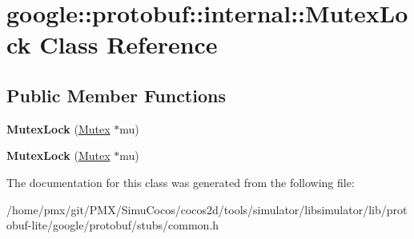 \hypertarget{classgoogle_1_1protobuf_1_1internal_1_1MutexLock}{}\section{google\+:\+:protobuf\+:\+:internal\+:\+:Mutex\+Lock Class Reference}
\label{classgoogle_1_1protobuf_1_1internal_1_1MutexLock}
\subsection*{Public Member Functions}
\begin{DoxyCompactItemize}
\item 
\mbox{\label{classgoogle_1_1protobuf_1_1internal_1_1MutexLock_a484d7e79513d968ad8b90b2513056cdd}} 
{\bfseries Mutex\+Lock} (\hyperlink{classgoogle_1_1protobuf_1_1internal_1_1Mutex}{Mutex} $\ast$mu)
\item 
\mbox{\label{classgoogle_1_1protobuf_1_1internal_1_1MutexLock_a484d7e79513d968ad8b90b2513056cdd}} 
{\bfseries Mutex\+Lock} (\hyperlink{classgoogle_1_1protobuf_1_1internal_1_1Mutex}{Mutex} $\ast$mu)
\end{DoxyCompactItemize}


The documentation for this class was generated from the following file\+:\begin{DoxyCompactItemize}
\item 
/home/pmx/git/\+P\+M\+X/\+Simu\+Cocos/cocos2d/tools/simulator/libsimulator/lib/protobuf-\/lite/google/protobuf/stubs/common.\+h\end{DoxyCompactItemize}
